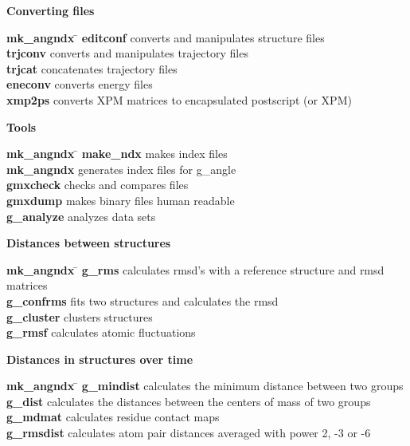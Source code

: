 \begin{description}
\item {\large\bf Converting files}
\begin{tabbing}
{\bf mk\_angndx} \= \kill
{\bf editconf} \> converts and manipulates structure files \\
{\bf trjconv} \> converts and manipulates trajectory files \\
{\bf trjcat} \> concatenates trajectory files \\
{\bf eneconv} \> converts energy files \\
{\bf xmp2ps} \> converts XPM matrices to encapsulated postscript (or XPM) \\
\end{tabbing}

\item {\large\bf Tools}
\begin{tabbing}
{\bf mk\_angndx} \= \kill
{\bf make\_ndx} \> makes index files \\
{\bf mk\_angndx} \> generates index files for g\_angle \\
{\bf gmxcheck} \> checks and compares files \\
{\bf gmxdump} \> makes binary files human readable \\
{\bf g\_analyze} \> analyzes data sets \\
\end{tabbing}

\item {\large\bf Distances between structures}
\begin{tabbing}
{\bf mk\_angndx} \= \kill
{\bf g\_rms} \> calculates rmsd's with a reference structure and rmsd matrices \\
{\bf g\_confrms} \> fits two structures and calculates the rmsd  \\
{\bf g\_cluster} \> clusters structures \\
{\bf g\_rmsf} \> calculates atomic fluctuations \\
\end{tabbing}

\item {\large\bf Distances in structures over time}
\begin{tabbing}
{\bf mk\_angndx} \= \kill
{\bf g\_mindist} \> calculates the minimum distance between two groups \\
{\bf g\_dist} \> calculates the distances between the centers of mass of two groups \\
{\bf g\_mdmat} \> calculates residue contact maps \\
{\bf g\_rmsdist} \> calculates atom pair distances averaged with power 2, -3 or -6 \\
\end{tabbing}


\end{description}
